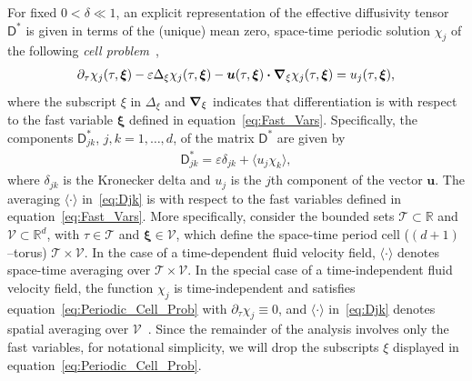 \documentclass[leqno,onefignum,onetabnum]{siamltex1213}
\newcommand{\Tc}{\mathcal{T}}
\newcommand{\Vc}{\mathcal{V}}
\newcommand{\Dm}{\mathsf{D}}
\newcommand\bnabla{\mbox{\boldmath${\nabla}$}}
\providecommand\bcdot{\boldsymbol{\cdot}}
\newcommand{\vecu}{\boldsymbol{u}}
\newcommand{\vecxi}{\boldsymbol{\xi}}
\begin{document}
For fixed $0<\delta\ll1$, an explicit representation of the
effective diffusivity tensor $\Dm^*$ is given in terms of the (unique)
mean zero, space-time periodic solution $\chi_j$ of the following
\emph{cell problem}~\cite{Biferale:PF:2725,Majda:Kramer:1999:book}, 
%
\begin{align}\label{eq:Periodic_Cell_Prob}
  \partial_\tau\chi_j(\tau,\vecxi)
  -\varepsilon\Delta_\xi\chi_j(\tau,\vecxi)
  -\vecu(\tau,\vecxi) \bcdot\bnabla_\xi \chi_j(\tau,\vecxi)
  =u_j(\tau,\vecxi),
\end{align}
%
where the subscript $\xi$ in $\Delta_\xi$ and $\bnabla_\xi$
indicates that differentiation is with respect to the fast variable
$\vecxi$ defined in equation~\eqref{eq:Fast_Vars}. Specifically,
the components $\Dm^*_{jk}$, $j,k=1,\ldots,d$, of the matrix $\Dm^*$ are given
by~\cite{McLaughlin:SIAM_JAM:780,Fannjiang:1994:SIAM_JAM:333,Majda:Kramer:1999:book}          
%
\begin{align}\label{eq:Djk}
  \Dm^*_{jk}=\varepsilon\delta_{jk}+\langle u_j\chi_k\rangle,
\end{align}
%
where $\delta_{jk}$ is the Kronecker delta and $u_j$ is the $j$th component
of the vector $\vecu$. The averaging $\langle\cdot\rangle$ in~\eqref{eq:Djk} is with
respect to the fast variables defined in
equation~\eqref{eq:Fast_Vars}. More specifically, consider the bounded
sets  $\Tc\subset\mathbb{R}$ and $\Vc\subset\mathbb{R}^d$, with $\tau\in\Tc$ and
$\vecxi\in\Vc$, which define the space-time period cell ($(d+1)$--torus)
$\Tc\times\Vc$. In the case of a time-dependent fluid velocity field, $\langle\cdot\rangle$
denotes space-time averaging over $\Tc\times\Vc$. In the special case of a
time-independent fluid velocity field, the function $\chi_j$ is
time-independent and satisfies equation~\eqref{eq:Periodic_Cell_Prob}
with $\partial_\tau\chi_j\equiv0$, and $\langle\cdot\rangle$ in~\eqref{eq:Djk} denotes spatial averaging over
$\Vc$~\cite{Fannjiang:1994:SIAM_JAM:333,Majda:Kramer:1999:book}. Since
the remainder of the analysis involves only the fast variables, for
notational simplicity, we will drop the subscripts $\xi$ displayed in
equation~\eqref{eq:Periodic_Cell_Prob}. 
\end{document}
